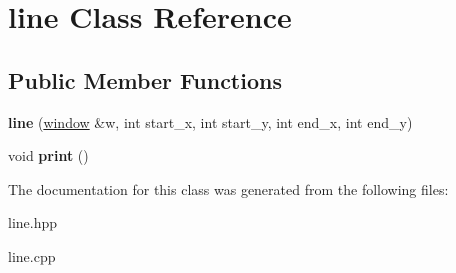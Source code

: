 \hypertarget{classline}{}\section{line Class Reference}
\label{classline}
\subsection*{Public Member Functions}
\begin{DoxyCompactItemize}
\item 
\mbox{\label{classline_a7f904d40532d34c424e65ccb27a35fe6}} 
{\bfseries line} (\hyperlink{classwindow}{window} \&w, int start\+\_\+x, int start\+\_\+y, int end\+\_\+x, int end\+\_\+y)
\item 
\mbox{\label{classline_a898f0c4e20bb93b2738613457530906f}} 
void {\bfseries print} ()
\end{DoxyCompactItemize}


The documentation for this class was generated from the following files\+:\begin{DoxyCompactItemize}
\item 
line.\+hpp\item 
line.\+cpp\end{DoxyCompactItemize}
